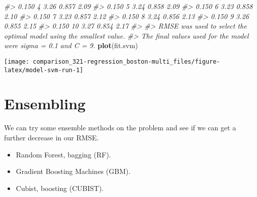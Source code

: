 \documentclass[]{book}
\newenvironment{Shaded}{\begin{snugshade}}{\end{snugshade}}
\newcommand{\CommentTok}[1]{\textcolor[rgb]{0.56,0.35,0.01}{\textit{#1}}}
\newcommand{\KeywordTok}[1]{\textcolor[rgb]{0.13,0.29,0.53}{\textbf{#1}}}
\newcommand{\NormalTok}[1]{#1}
\providecommand{\tightlist}{%
  \setlength{\itemsep}{0pt}\setlength{\parskip}{0pt}}
\begin{document}
\begin{Shaded}
\begin{Highlighting}[]
\CommentTok{#>   0.150   4  3.26  0.857     2.09}
\CommentTok{#>   0.150   5  3.24  0.858     2.09}
\CommentTok{#>   0.150   6  3.23  0.858     2.10}
\CommentTok{#>   0.150   7  3.23  0.857     2.12}
\CommentTok{#>   0.150   8  3.24  0.856     2.13}
\CommentTok{#>   0.150   9  3.26  0.855     2.15}
\CommentTok{#>   0.150  10  3.27  0.854     2.17}
\CommentTok{#> }
\CommentTok{#> RMSE was used to select the optimal model using the smallest value.}
\CommentTok{#> The final values used for the model were sigma = 0.1 and C = 9.}
\KeywordTok{plot}\NormalTok{(fit.svm)}
\end{Highlighting}
\end{Shaded}

\begin{center}\texttt{[image: comparison\_321-regression\_boston-multi\_files/figure-latex/model-svm-run-1]} \end{center}

\hypertarget{ensembling}{%
\section{Ensembling}\label{ensembling}}

We can try some ensemble methods on the problem and see if we can get a further decrease in our RMSE.

\begin{itemize}
\tightlist
\item
  Random Forest, bagging (RF).
\item
  Gradient Boosting Machines (GBM).
\item
  Cubist, boosting (CUBIST).
\end{itemize}
\end{document}
